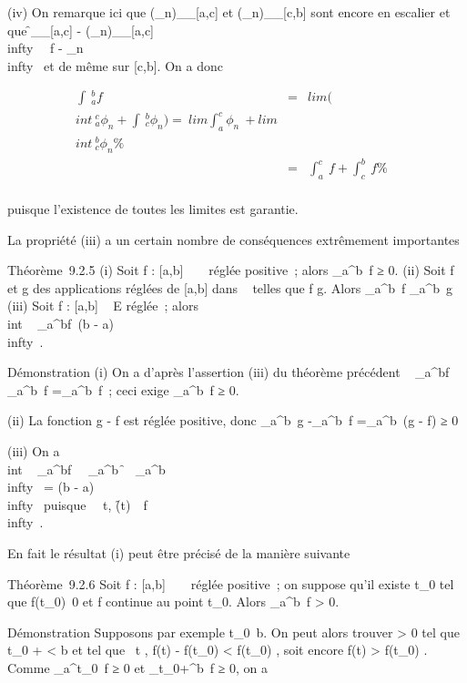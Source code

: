 \documentclass[]{article}
\begin{document}
(iv) On remarque ici que
(\phi_n)__[a,c] et
(\phi_n)__[c,b] sont encore en
escalier et que
\f__[a,c] -
(\phi_n)__[a,c]\\infty~
\leq\ f - \phi_n\\infty~
et de même sur [c,b]. On a donc

\begin{align*} \int ~
_a^bf& =&
lim(\\int ~
_a^c\phi_ n +\int ~
_c^b\phi_ n) =\
lim\int  _a^c\phi_ n~
+ lim\\int ~
_c^b\phi_ n\%& \\ &
=& \int  _a^c~f
+\int  _c^b~f \%&
\\ \end{align*}

puisque l'existence de toutes les limites est garantie.

La propriété (iii) a un certain nombre de conséquences extrêmement
importantes

Théorème~9.2.5 (i) Soit f : [a,b] \rightarrow~ ~ réglée positive~; alors
\int  _a^b~f ≥ 0. (ii) Soit f et g
des applications réglées de [a,b] dans ~ telles que f \leq g. Alors
\int  _a^b~f
\leq\int  _a^b~g (iii) Soit f :
[a,b] \rightarrow~ E réglée~; alors
\\int ~
_a^bf\ \leq (b -
a)\f\\infty~.

Démonstration (i) On a d'après l'assertion (iii) du théorème précédent
\left \int ~
_a^bf\right 
\leq\int  _a^b~f
=\int  _a^b~f~; ceci exige
\int  _a^b~f ≥ 0.

(ii) La fonction g - f est réglée positive, donc
\int  _a^b~g
-\int  _a^b~f
=\int  _a^b~(g - f) ≥ 0

(iii) On a \\int ~
_a^bf\
\leq\int ~
_a^b\f\
\leq\int ~
_a^b\f\\infty~
= (b - a)\f\\infty~ puisque
\forall~~t,
\f(t)\
\leq\ f\\infty~.

En fait le résultat (i) peut être précisé de la manière suivante

Théorème~9.2.6 Soit f : [a,b] \rightarrow~ ~ réglée positive~; on suppose qu'il
existe t_0 \in [a,b] tel que
f(t_0)\neq~0 et f continue au point
t_0. Alors \int  _a^b~f
> 0.

Démonstration Supposons par exemple
t_0\neq~b. On peut alors trouver \eta
> 0 tel que t_0 + \eta < b et tel que
\forall~t \in [t_0,t_0~ + \eta],
f(t) - f(t_0) < f(t_0)
\over 2 , soit encore f(t) >
f(t_0) \over 2 . Comme
\int  _a^t_0~f ≥ 0 et
\int  _t_0+\eta^b~f ≥ 0, on
a
\end{document}
